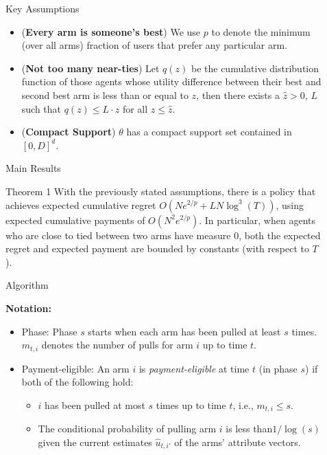 \documentclass[final]{beamer}
\newlength{\sepwid}
\newlength{\onecolwid}
\begin{document}
\begin{frame}[t]
\begin{columns}[t]
\begin{column}{\onecolwid}
\end{column} %

\begin{column}{\sepwid}\end{column} %
\begin{column}{\onecolwid} %


\begin{block}{Key Assumptions}

\begin{itemize}
\item (\textbf{Every arm is someone's best}) We use $p$ to denote the minimum (over all arms) fraction of users that prefer any particular arm.
\item (\textbf{Not too many near-ties}) Let $q(z)$ be the cumulative distribution function of those agents whose utility difference between their best and second best arm is less than or equal to $z$, then there exists a $\hat{z}>0$, $L$ such that $q(z)\leq L\cdot z$ for all $z\leq \hat{z}$.
\item (\textbf{Compact Support}) $\theta$ has a compact support set contained in $[0,D]^{d}$.
\end{itemize}

\end{block}


\begin{block}{Main Results}
\begin{alertblock}{Theorem 1}
With the previously stated assumptions, there is a policy that achieves expected 
cumulative regret $O (N e^{2/p} + L N \log^3(T))$,
using expected cumulative payments of $O(N^2 e^{2/p})$.
\newline
\newline
In particular, when agents who are close to tied between two arms have measure $0$,
both the expected regret and expected payment are bounded by constants
(with respect to $T$). 
\end{alertblock}
\end{block}

\begin{block}{Algorithm}


\textbf{Notation:}
\vspace{0.5cm}
\begin{itemize}
\item Phase: Phase $s$ starts when each arm has been pulled at least $s$ times. $m_{t,i}$ denotes the number of pulls for arm $i$ up to time $t$. 
\item Payment-eligible: An arm $i$ is \emph{payment-eligible} at time $t$ (in phase $s$) if both of the following hold:
\begin{itemize}
\item $i$ has been pulled at most $s$ times up to time $t$, i.e., $m_{t,i} \leq s$.
\item  The conditional probability of pulling arm $i$ is less than$1/\log(s)$ given the current estimates $\hat{u}_{t,i'}$ of the arms' attribute vectors.  
\end{itemize}
\end{itemize}



\end{block}
\end{column}
\end{columns}
\end{frame}
\end{document}
